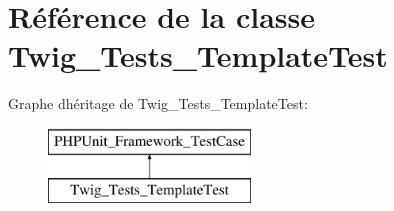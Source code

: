 \hypertarget{class_twig___tests___template_test}{}\section{Référence de la classe Twig\+\_\+\+Tests\+\_\+\+Template\+Test}
\label{class_twig___tests___template_test}
Graphe d\textquotesingle{}héritage de Twig\+\_\+\+Tests\+\_\+\+Template\+Test\+:\begin{figure}[H]
\begin{center}
\leavevmode
\includegraphics[height=2.000000cm]{class_twig___tests___template_test}
\end{center}
\end{figure}
